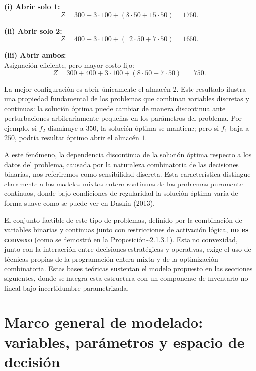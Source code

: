 \documentclass[
  spanish,
  us-letterpaper,
  DIV=11,
  numbers=noendperiod]{scrreprt}
\numberwithin{equation}{section}
\begin{document}
\textbf{(i) Abrir solo 1:}\\
\[
Z = 300 + 3\cdot 100 + (8\cdot 50 + 15\cdot 50)=1750.
\]

\textbf{(ii) Abrir solo 2:}\\
\[
Z = 400 + 3\cdot 100 + (12\cdot 50 + 7\cdot 50)=1650.
\]

\textbf{(iii) Abrir ambos:}\\
Asignación eficiente, pero mayor costo fijo:\\
\[
Z = 300 + 400 + 3\cdot 100 + (8\cdot 50 + 7\cdot 50)=1750.
\]

La mejor configuración es abrir únicamente el almacén 2. Este resultado
ilustra una propiedad fundamental de los problemas que combinan
variables discretas y continuas: la solución óptima puede cambiar de
manera discontinua ante perturbaciones arbitrariamente pequeñas en los
parámetros del problema. Por ejemplo, si \(f_2\) disminuye a \(350\), la
solución óptima se mantiene; pero si \(f_1\) baja a \(250\), podría
resultar óptimo abrir el almacén \(1\).

A este fenómeno, la dependencia discontinua de la solución óptima
respecto a los datos del problema, causada por la naturaleza
combinatoria de las decisiones binarias, nos referiremos como
sensibilidad discreta. Esta característica distingue claramente a los
modelos mixtos entero-continuos de los problemas puramente continuos,
donde bajo condiciones de regularidad la solución óptima varía de forma
suave como se puede ver en Daskin (2013).

El conjunto factible de este tipo de problemas, definido por la
combinación de variables binarias y continuas junto con restricciones de
activación lógica, \textbf{no es convexo} (como se demostró en la
Proposición\textasciitilde2.1.3.1). Esta no convexidad, junto con la
interacción entre decisiones estratégicas y operativas, exige el uso de
técnicas propias de la programación entera mixta y de la optimización
combinatoria. Estas bases teóricas sustentan el modelo propuesto en las
secciones siguientes, donde se integra esta estructura con un componente
de inventario no lineal bajo incertidumbre parametrizada.

\section{Marco general de modelado: variables, parámetros y espacio de
decisión}\label{marco-general-de-modelado-variables-paruxe1metros-y-espacio-de-decisiuxf3n}
\end{document}
